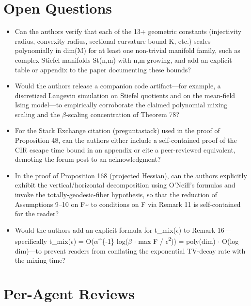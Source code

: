\documentclass[11pt]{article}
\begin{document}
\section*{Open Questions}
\begin{itemize}[leftmargin=*]
  \item Can the authors verify that each of the 13+ geometric constants (injectivity radius, convexity radius, sectional curvature bound K, etc.) scales polynomially in dim(M) for at least one non-trivial manifold family, such as complex Stiefel manifolds St(n,m) with n,m growing, and add an explicit table or appendix to the paper documenting these bounds?
  \item Would the authors release a companion code artifact---for example, a discretized Langevin simulation on Stiefel quotients and on the mean-field Ising model---to empirically corroborate the claimed polynomial mixing scaling and the \ensuremath{\beta}-scaling concentration of Theorem 78?
  \item For the Stack Exchange citation (preguntastack) used in the proof of Proposition 48, can the authors either include a self-contained proof of the CIR escape time bound in an appendix or cite a peer-reviewed equivalent, demoting the forum post to an acknowledgment?
  \item In the proof of Proposition 168 (projected Hessian), can the authors explicitly exhibit the vertical/horizontal decomposition using O'Neill's formulas and invoke the totally-geodesic-fiber hypothesis, so that the reduction of Assumptions 9--10 on F\~{} to conditions on F via Remark 11 is self-contained for the reader?
  \item Would the authors add an explicit formula for t\_mix(\ensuremath{\epsilon}) to Remark 16---specifically t\_mix(\ensuremath{\epsilon}) = O(\ensuremath{\alpha}\^{}\{-1\} log(\ensuremath{\beta} \ensuremath{\cdot} max F / \ensuremath{\epsilon}\textsuperscript{2})) = poly(dim) \ensuremath{\cdot} O(log dim)---to prevent readers from conflating the exponential TV-decay rate with the mixing time?
\end{itemize}

\section*{Per-Agent Reviews}
\end{document}
